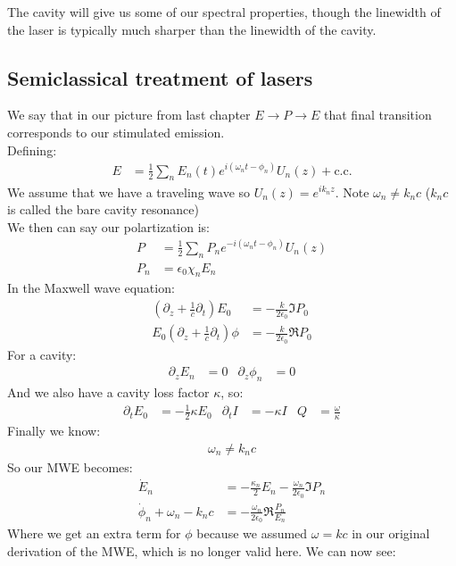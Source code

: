 The cavity will give us some of our spectral properties, though the linewidth of the laser is typically much sharper than the linewidth of the cavity.
\subsection{Semiclassical treatment of lasers}
We say that in our picture from last chapter $E\to P\to E$ that final transition corresponds to our stimulated emission.\\
Defining:
\begin{align*}
	E &= \frac{1}{2}\sum_n E_n(t) e^{i(\omega_n t - \phi_n)} U_n(z) + \text{c.c.}
\end{align*}
We assume that we have a traveling wave so $U_n(z) = e^{ik_n z}$. Note $\omega_n \neq k_n c$ ($k_n c$ is called the bare cavity resonance) \\
We then can say our polartization is:
\begin{align*}
	P &= \frac{1}{2}\sum_n P_n e^{-i(\omega_n t - \phi_n)} U_n(z) \\
	P_n &= \epsilon_0 \chi_n E_n
\end{align*}
In the Maxwell wave equation:
\begin{align*}
	\left(\partial_z + \frac{1}{c}\partial_t\right)E_0 &= -\frac{k}{2\epsilon_0} \Im P_0 \\
	E_0\left(\partial_z + \frac{1}{c}\partial_t\right)\phi &= -\frac{k}{2\epsilon_0}\Re P_0
\end{align*}
For a cavity:
\begin{align*}
	\partial_z E_n &= 0 &
	\partial_z \phi_n &= 0
\end{align*}
And we also have a cavity loss factor $\kappa$, so:
\begin{align*}
	\partial_t E_0 &= -\frac{1}{2}\kappa E_0 &
	\partial_t I &= -\kappa I &
	Q &= \frac{\omega}{\kappa}
\end{align*}
Finally we know:
\begin{align*}
	\omega_n\neq k_n c
\end{align*}
So our MWE becomes:
\begin{align*}
	\dot{E}_n &= -\frac{\kappa_n}{2}E_n - \frac{\omega_n}{2\epsilon_0}\Im P_n \\
	\dot{\phi}_n +\omega_n - k_n c &= -\frac{\omega_n}{2\epsilon_0}\Re \frac{P_n}{E_n}
\end{align*}
Where we get an extra term for $\phi$ because we assumed $\omega = kc$ in our original derivation of the MWE, which is no longer valid here. We can now see:
